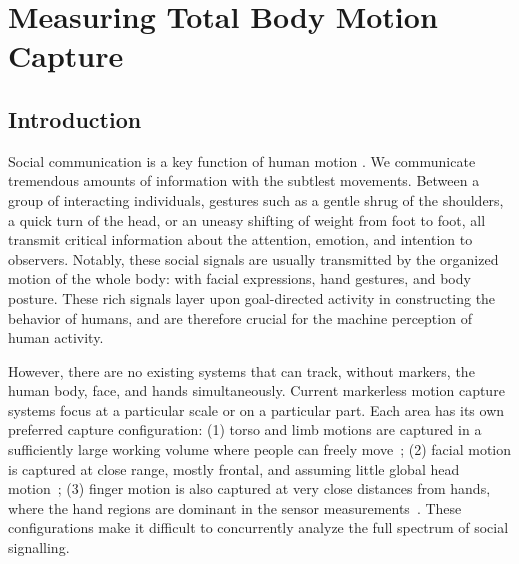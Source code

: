 
\chapter{Measuring Total Body Motion Capture}
\label{chapter:totalcapture}



\section{Introduction}
Social communication is a key function of human motion \cite{Birdwhistell70}. We communicate tremendous amounts of information with the subtlest movements. Between a group of interacting individuals, gestures such as a gentle shrug of the shoulders, a quick turn of the head, or an uneasy shifting of weight from foot to foot, all transmit critical information about the attention, emotion, and intention to observers. Notably, these social signals are usually transmitted by the organized motion of the whole body: with facial expressions, hand gestures, and body posture. These rich signals layer upon goal-directed activity in constructing the behavior of humans, and are therefore crucial for the machine perception of human activity. 

However, there are no existing systems that can track, without markers, the human body, face, and hands simultaneously. Current markerless motion capture systems focus at a particular scale or on a particular part. Each area has its own preferred capture configuration: (1) torso and limb motions are captured in a sufficiently large working volume where people can freely move~\cite{deAguiar-2008, Gall-09, Stoll-11, Elhayek-15}; (2) facial motion is captured at close range, mostly frontal, and assuming little global head motion~\cite{Beeler:SIGGRAPH2010,ghosh2011multiview, Beeler:SIGGRAPH2011, bradley2010high, valgaerts2012lightweight}; (3) finger motion is also captured at very close distances from hands, where the hand regions are dominant in the sensor measurements~\cite{Oikonomidis-12, Tompson-14a, Sridha-15, Tzionas-16}. These configurations make it difficult to concurrently analyze the full spectrum of social signalling.



